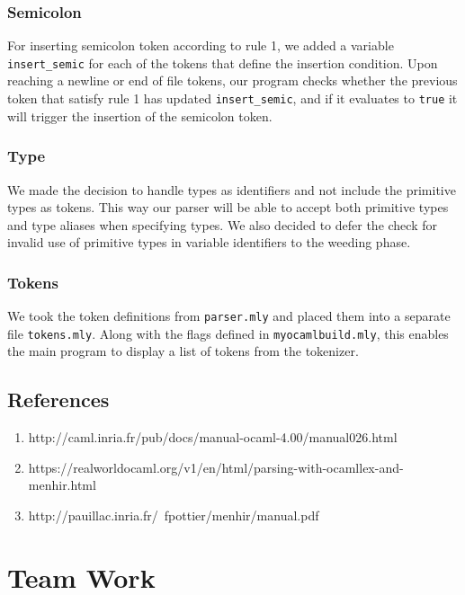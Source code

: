 \documentclass{article}
\begin{document}
\subsubsection*{Semicolon}
For inserting semicolon token according to rule 1, we added a variable \verb|insert_semic| for each of the tokens that define the insertion condition. Upon reaching a newline or end of file tokens, our program checks whether the previous token that satisfy rule 1 has updated \verb|insert_semic|, and if it evaluates to \verb|true| it will trigger the insertion of the semicolon token.

\subsubsection*{Type}
We made the decision to handle types as identifiers and not include the primitive types as tokens. This way our parser will be able to accept both primitive types and type aliases when specifying types. We also decided to defer the check for invalid use of primitive types in variable identifiers to the weeding phase.

\subsubsection*{Tokens}
We took the token definitions from \verb|parser.mly| and placed them into a separate file \verb|tokens.mly|. Along with the flags defined in \verb|myocamlbuild.mly|, this enables the main program to display a list of tokens from the tokenizer.

\subsection*{References}
\begin{enumerate}
  \item http://caml.inria.fr/pub/docs/manual-ocaml-4.00/manual026.html
  \item https://realworldocaml.org/v1/en/html/parsing-with-ocamllex-and-menhir.html
  \item http://pauillac.inria.fr/~fpottier/menhir/manual.pdf
\end{enumerate}

\section*{Team Work}
\end{document}
